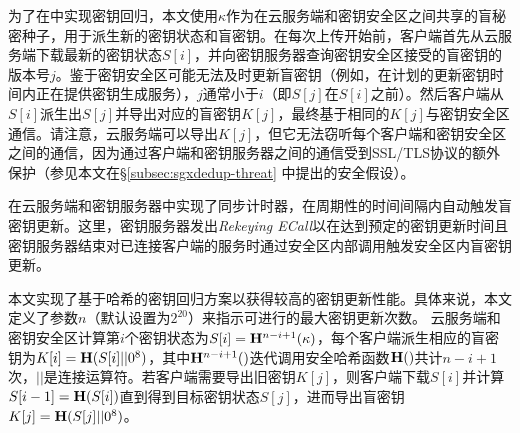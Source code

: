 为了在\sysnameS 中实现密钥回归，本文使用$\kappa$作为在云服务端和密钥安全区之间共享的盲秘密种子，用于派生新的密钥状态和盲密钥。在每次上传开始前，客户端首先从云服务端下载最新的密钥状态$S[i]$，并向密钥服务器查询密钥安全区接受的盲密钥的版本号$j$。鉴于密钥安全区可能无法及时更新盲密钥（例如，在计划的更新密钥时间内正在提供密钥生成服务），$j$通常小于$i$（即$S[j]$在$S[i]$之前）。然后客户端从$S[i]$派生出$S[j]$并导出对应的盲密钥$K[j]$，最终基于相同的$K[j]$与密钥安全区通信。请注意，云服务端可以导出$K[j]$，但它无法窃听每个客户端和密钥安全区之间的通信，因为通过客户端和密钥服务器之间的通信受到SSL/TLS协议的额外保护（参见本文在\S\ref{subsec:sgxdedup-threat} 中提出的安全假设）。

\sysnameS 在云服务端和密钥服务器中实现了同步计时器，在周期性的时间间隔内自动触发盲密钥更新。这里，密钥服务器发出\textit{Rekeying ECall}以在达到预定的密钥更新时间且密钥服务器结束对已连接客户端的服务时通过安全区内部调用触发安全区内盲密钥更新。

本文实现了基于哈希的密钥回归方案\cite{fu06}以获得较高的密钥更新性能。具体来说，本文定义了参数$n$（默认设置为$2^{20}$\cite{fu06}）来指示可进行的最大密钥更新次数。 云服务端和密钥安全区计算第$i$个密钥状态为$S[i] = {\bf H}^{n-i+1}(\kappa)$，每个客户端派生相应的盲密钥为$K[i] = {\bf H}(S[i] || 0^8)$，其中${\bf H}^{n-i+1}()$迭代调用安全哈希函数${\bf H}()$共计$n-i+1$次，$||$是连接运算符。若客户端需要导出旧密钥$K[j]$，则客户端下载$S[i]$并计算$S[i-1] = {\bf H}(S[i])$直到得到目标密钥状态$S[j]$，进而导出盲密钥$K[j] = {\bf H}(S[j] || 0^8)$。
